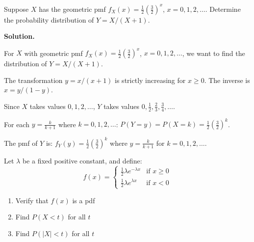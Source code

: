 \begin{problembox}
Suppose $X$ has the geometric pmf $f_X(x) = \frac{1}{2}(\frac{3}{2})^x$, $x = 0, 1, 2, \ldots$. Determine the probability distribution of $Y = X/(X+1)$.
\end{problembox}

\noindent\textbf{Solution.}

For $X$ with geometric pmf $f_X(x) = \frac{1}{2}(\frac{3}{2})^x$, $x = 0, 1, 2, \ldots$, we want to find the distribution of $Y = X/(X+1)$.

The transformation $y = x/(x+1)$ is strictly increasing for $x \geq 0$. The inverse is $x = y/(1-y)$.

Since $X$ takes values $0, 1, 2, \ldots$, $Y$ takes values $0, \frac{1}{2}, \frac{2}{3}, \frac{3}{4}, \ldots$.

For each $y = \frac{k}{k+1}$ where $k = 0, 1, 2, \ldots$:
$P(Y = y) = P(X = k) = \frac{1}{2}(\frac{3}{2})^k$.

The pmf of $Y$ is:
$f_Y(y) = \frac{1}{2}(\frac{3}{2})^k$ where $y = \frac{k}{k+1}$ for $k = 0, 1, 2, \ldots$.

\begin{problembox}
Let $\lambda$ be a fixed positive constant, and define:
\[ f(x) = \begin{cases}
\frac{1}{2}\lambda e^{-\lambda x} & \text{if } x \geq 0 \\
\frac{1}{2}\lambda e^{\lambda x} & \text{if } x < 0
\end{cases} \]
\begin{enumerate}[label=(\alph*)]
    \item Verify that $f(x)$ is a pdf
    \item Find $P(X < t)$ for all $t$
    \item Find $P(|X| < t)$ for all $t$
\end{enumerate}
\end{problembox}

